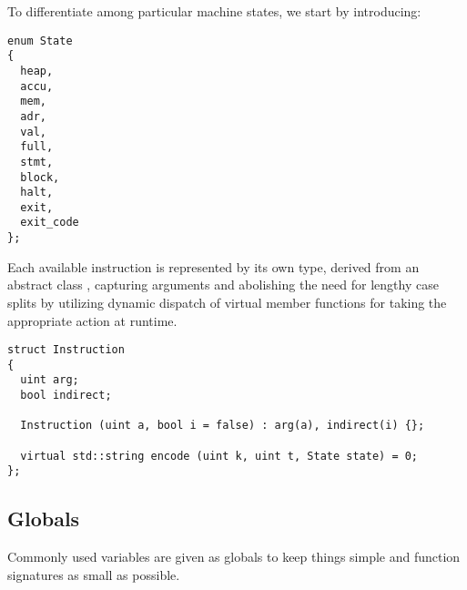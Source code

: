 To differentiate among particular machine states, we start by introducing:%


\begin{lstlisting}[style=c++]
enum State
{
  heap,
  accu,
  mem,
  adr,
  val,
  full,
  stmt,
  block,
  halt,
  exit,
  exit_code
};
\end{lstlisting}
Each available instruction is represented by its own type, derived from an abstract class , capturing arguments and abolishing the need for lengthy case splits by utilizing dynamic dispatch of virtual member functions for taking the appropriate action at runtime.%

\begin{lstlisting}[style=c++]
struct Instruction
{
  uint arg;
  bool indirect;

  Instruction (uint a, bool i = false) : arg(a), indirect(i) {};

  virtual std::string encode (uint k, uint t, State state) = 0;
};
\end{lstlisting}

\subsection*{Globals}

Commonly used variables are given as globals to keep things simple and function signatures as small as possible.

